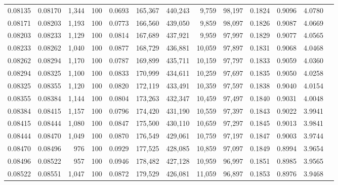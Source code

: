 \begin{tabular}{rrrrrrrrrrrrr}
0.08135 & 0.08170 & 1,344 & 100 &                                     0.0693 & 165,367 & 440,243 &   9,759 &  98,197 & 0.1824 & 0.9096 & 4.0780 \\
0.08171 & 0.08203 & 1,193 & 100 &                                     0.0773 & 166,560 & 439,050 &   9,859 &  98,097 & 0.1826 & 0.9087 & 4.0669 \\
0.08203 & 0.08233 & 1,129 & 100 &                                     0.0814 & 167,689 & 437,921 &   9,959 &  97,997 & 0.1829 & 0.9077 & 4.0565 \\
0.08233 & 0.08262 & 1,040 & 100 &                                     0.0877 & 168,729 & 436,881 &  10,059 &  97,897 & 0.1831 & 0.9068 & 4.0468 \\
0.08262 & 0.08294 & 1,170 & 100 &                                     0.0787 & 169,899 & 435,711 &  10,159 &  97,797 & 0.1833 & 0.9059 & 4.0360 \\
0.08294 & 0.08325 & 1,100 & 100 &                                     0.0833 & 170,999 & 434,611 &  10,259 &  97,697 & 0.1835 & 0.9050 & 4.0258 \\
0.08325 & 0.08355 & 1,120 & 100 &                                     0.0820 & 172,119 & 433,491 &  10,359 &  97,597 & 0.1838 & 0.9040 & 4.0154 \\
0.08355 & 0.08384 & 1,144 & 100 &                                     0.0804 & 173,263 & 432,347 &  10,459 &  97,497 & 0.1840 & 0.9031 & 4.0048 \\
0.08384 & 0.08415 & 1,157 & 100 &                                     0.0796 & 174,420 & 431,190 &  10,559 &  97,397 & 0.1843 & 0.9022 & 3.9941 \\
0.08415 & 0.08444 & 1,080 & 100 &                                     0.0847 & 175,500 & 430,110 &  10,659 &  97,297 & 0.1845 & 0.9013 & 3.9841 \\
0.08444 & 0.08470 & 1,049 & 100 &                                     0.0870 & 176,549 & 429,061 &  10,759 &  97,197 & 0.1847 & 0.9003 & 3.9744 \\
0.08470 & 0.08496 &   976 & 100 &                                     0.0929 & 177,525 & 428,085 &  10,859 &  97,097 & 0.1849 & 0.8994 & 3.9654 \\
0.08496 & 0.08522 &   957 & 100 &                                     0.0946 & 178,482 & 427,128 &  10,959 &  96,997 & 0.1851 & 0.8985 & 3.9565 \\
0.08522 & 0.08551 & 1,047 & 100 &                                     0.0872 & 179,529 & 426,081 &  11,059 &  96,897 & 0.1853 & 0.8976 & 3.9468 \\

\end{tabular}
